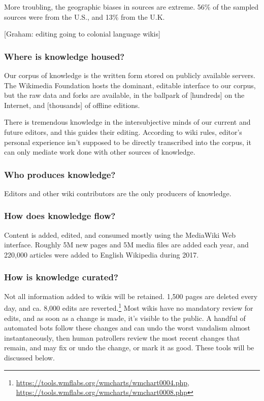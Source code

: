 More troubling, the geographic biases in sources are extreme.  56\% of the sampled sources were from the U.S., and 13\% from the U.K.

[Graham: editing going to colonial language wikis]

\subsubsection{Where is knowledge housed?}

Our corpus of knowledge is the written form stored on publicly available servers.  The Wikimedia Foundation hosts the dominant, editable interface to our corpus, but the raw data and forks are available, in the ballpark of [hundreds] on the Internet, and [thousands] of offline editions.

There is tremendous knowledge in the intersubjective minds of our current and future editors, and this guides their editing.  According to wiki rules, editor's personal experience isn't supposed to be directly transcribed into the corpus, it can only mediate work done with other sources of knowledge.

\subsubsection{Who produces knowledge?}

Editors and other wiki contributors are the only producers of knowledge.

\subsubsection{How does knowledge flow?}

Content is added, edited, and consumed mostly using the MediaWiki Web interface.  Roughly 5M new pages and 5M media files are added each year, and 220,000 articles were added to English Wikipedia during 2017.

\subsubsection{How is knowledge curated?}

Not all information added to wikis will be retained.  1,500 pages are deleted every day, and ca. 8,000 edits are reverted.\footnote{\url{https://tools.wmflabs.org/wmcharts/wmchart0004.php}, \url{https://tools.wmflabs.org/wmcharts/wmchart0008.php}}  Most wikis have no mandatory review for edits, and as soon as a change is made, it's visible to the public.  A handful of automated bots follow these changes and can undo the worst vandalism almost instantaneously, then human patrollers review the most recent changes that remain, and may fix or undo the change, or mark it as good.  These tools will be discussed below.

